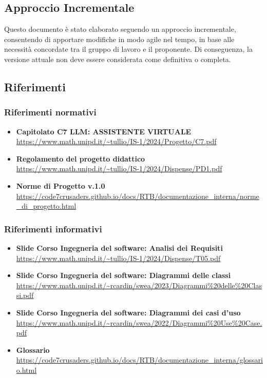 \subsection{Approccio Incrementale}
Questo documento è stato elaborato seguendo un approccio incrementale, 
consentendo di apportare modifiche in modo agile nel tempo, 
in base alle necessità concordate tra il gruppo di lavoro e il proponente. Di conseguenza, 
la versione attuale non deve essere considerata come definitiva o completa.

\subsection{Riferimenti}
\subsubsection{Riferimenti normativi}
\begin{itemize}
    \item \textbf{Capitolato C7 LLM: ASSISTENTE VIRTUALE} \\ \url{https://www.math.unipd.it/~tullio/IS-1/2024/Progetto/C7.pdf}
    \item \textbf{Regolamento del progetto didattico} \\ \url{https://www.math.unipd.it/~tullio/IS-1/2024/Dispense/PD1.pdf}
    \item \textbf{Norme di Progetto v.1.0} \\ \url{https://code7crusaders.github.io/docs/RTB/documentazione_interna/norme_di_progetto.html}
\end{itemize}

\subsubsection{Riferimenti informativi}
\begin{itemize}
    \item \textbf{Slide Corso Ingegneria del software: Analisi dei Requisiti} \\ \url{https://www.math.unipd.it/~tullio/IS-1/2024/Dispense/T05.pdf}
    \item \textbf{Slide Corso Ingegneria del software: Diagrammi delle classi} \\ \url{https://www.math.unipd.it/~rcardin/swea/2023/Diagrammi%20delle%20Classi.pdf}
    \item \textbf{Slide Corso Ingegneria del software: Diagrammi dei casi d'uso}\\ \url{https://www.math.unipd.it/~rcardin/swea/2022/Diagrammi%20Use%20Case.pdf}
    \item \textbf{Glossario} \\ \url{https://code7crusaders.github.io/docs/RTB/documentazione_interna/glossario.html}
\end{itemize}
